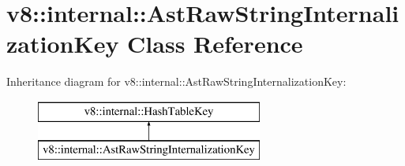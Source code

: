 \hypertarget{classv8_1_1internal_1_1_ast_raw_string_internalization_key}{}\section{v8\+:\+:internal\+:\+:Ast\+Raw\+String\+Internalization\+Key Class Reference}
\label{classv8_1_1internal_1_1_ast_raw_string_internalization_key}
Inheritance diagram for v8\+:\+:internal\+:\+:Ast\+Raw\+String\+Internalization\+Key\+:\begin{figure}[H]
\begin{center}
\leavevmode
\includegraphics[height=2.000000cm]{classv8_1_1internal_1_1_ast_raw_string_internalization_key}
\end{center}
\end{figure}
